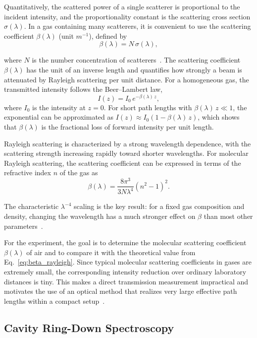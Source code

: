 \documentclass[a4paper]{article}
\begin{document}
Quantitatively, the scattered power of a single scatterer is proportional to the incident intensity, and the proportionality constant is the scattering cross section $\sigma(\lambda)$.
In a gas containing many scatterers, it is convenient to use the scattering coefficient $\beta(\lambda)$ (unit $\si{m^{-1}}$), defined by
\begin{equation}
\beta(\lambda)=N\,\sigma(\lambda),
\label{eq:beta_def}
\end{equation}

where $N$ is the number concentration of scatterers~\cite{RAYAnleitung}.
The scattering coefficient $\beta(\lambda)$ has the unit of an inverse length and quantifies how strongly a beam is attenuated by Rayleigh scattering per unit distance.
For a homogeneous gas, the transmitted intensity follows the Beer--Lambert law,
\[
I(z)=I_0\,e^{-\beta(\lambda)\,z},
\]
where $I_0$ is the intensity at $z=0$.
For short path lengths with $\beta(\lambda)\,z\ll 1$, the exponential can be approximated as $I(z)\approx I_0\left(1-\beta(\lambda)\,z\right)$, which shows that $\beta(\lambda)$ is the fractional loss of forward intensity per unit length.

Rayleigh scattering is characterized by a strong wavelength dependence, with the scattering strength increasing rapidly toward shorter wavelengths.
For molecular Rayleigh scattering, the scattering coefficient can be expressed in terms of the refractive index $n$ of the gas as
\begin{equation}
\beta(\lambda)=\frac{8\pi^{3}}{3N\lambda^{4}}\left(n^{2}-1\right)^{2}.
\label{eq:beta_rayleigh}
\end{equation}

The characteristic $\lambda^{-4}$ scaling is the key result: for a fixed gas composition and density, changing the wavelength has a much stronger effect on $\beta$ than most other parameters~\cite{RAYAnleitung}.

For the experiment, the goal is to determine the molecular scattering coefficient $\beta(\lambda)$ of air and to compare it with the theoretical value from Eq.~\eqref{eq:beta_rayleigh}.
Since typical molecular scattering coefficients in gases are extremely small, the corresponding intensity reduction over ordinary laboratory distances is tiny.
This makes a direct transmission measurement impractical and motivates the use of an optical method that realizes very large effective path lengths within a compact setup~\cite{RAYAnleitung}.

\subsection{Cavity Ring-Down Spectroscopy}
\label{sec:theory_crds}
\end{document}
